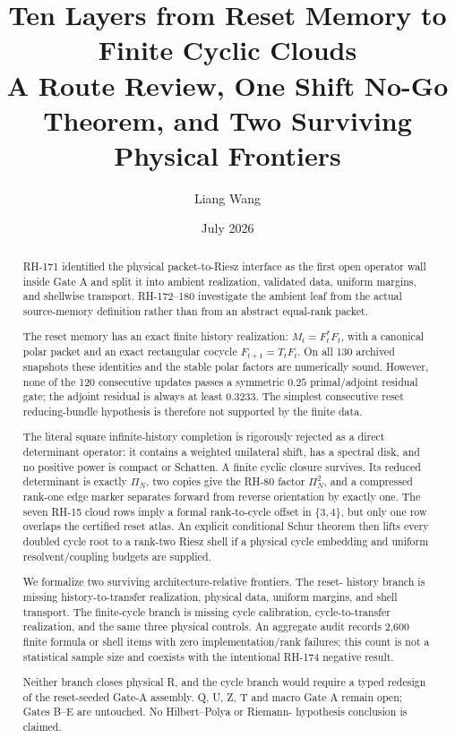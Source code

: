 \documentclass[12pt]{article}
\title{Ten Layers from Reset Memory to Finite Cyclic Clouds\\
\large A Route Review, One Shift No-Go Theorem, and Two Surviving Physical Frontiers}
\author{Liang Wang}
\date{July 2026}
\theoremstyle{remark}
\begin{document}
\maketitle

\begin{abstract}
RH-171 identified the physical packet-to-Riesz interface as the first open
operator wall inside Gate A and split it into ambient realization, validated
data, uniform margins, and shellwise transport.  RH-172--180 investigate the
ambient leaf from the actual source-memory definition rather than from an
abstract equal-rank packet.

The reset memory has an exact finite history realization:
$M_t=F_t^*F_t$, with a canonical polar packet and an exact rectangular
cocycle $F_{t+1}=T_tF_t$.  On all 130 archived snapshots these identities and
the stable polar factors are numerically sound.  However, none of the 120
consecutive updates passes a symmetric $0.25$ primal/adjoint residual gate;
the adjoint residual is always at least $0.3233$.  The simplest consecutive
reset reducing-bundle hypothesis is therefore not supported by the finite
data.

The literal square infinite-history completion is rigorously rejected as a
direct determinant operator: it contains a weighted unilateral shift, has a
spectral disk, and no positive power is compact or Schatten.  A finite cyclic
closure survives.  Its reduced determinant is exactly $\Pi_N$, two copies
give the RH-80 factor $\Pi_N^2$, and a compressed rank-one edge marker
separates forward from reverse orientation by exactly one.  The seven RH-15
cloud rows imply a formal rank-to-cycle offset in $\{3,4\}$, but only one row
overlaps the certified reset atlas.  An explicit conditional Schur theorem
then lifts every doubled cycle root to a rank-two Riesz shell if a physical
cycle embedding and uniform resolvent/coupling budgets are supplied.

We formalize two surviving architecture-relative frontiers.  The reset-
history branch is missing history-to-transfer realization, physical data,
uniform margins, and shell transport.  The finite-cycle branch is missing
cycle calibration, cycle-to-transfer realization, and the same three
physical controls.  An aggregate audit records 2,600 finite formula or shell
items with zero implementation/rank failures; this count is not a statistical
sample size and coexists with the intentional RH-174 negative result.

Neither branch closes physical R, and the cycle branch would require a typed
redesign of the reset-seeded Gate-A assembly.  Q, U, Z, T and macro Gate A
remain open; Gates B--E are untouched.  No Hilbert--Polya or Riemann-
hypothesis conclusion is claimed.
\end{abstract}
\end{document}
